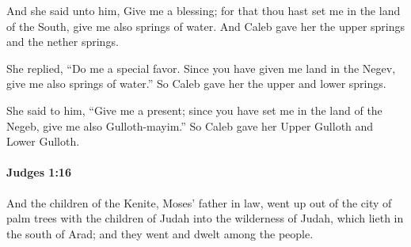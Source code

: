 			\begin{versebox}
					\item[BHS] 
					\item[ASV] And she said unto him, Give me a blessing; for that thou hast set me in the land of the South, give me also springs of water. And Caleb gave her the upper springs and the nether springs.
					\item[NIV] She replied, “Do me a special favor. Since you have given me land in the Negev, give me also springs of water.” So Caleb gave her the upper and lower springs.
					\item[NRSV] She said to him, “Give me a present; since you have set me in the land of the Negeb, give me also Gulloth-mayim.” So Caleb gave her Upper Gulloth and Lower Gulloth.
			\end{versebox}

		\paragraph{Judges 1:16} %
			\label{JUDGES-1-16}

			And the children of the Kenite, Moses’ father in law, went up out of the city of palm trees with the children of Judah into the wilderness of Judah, which lieth in the south of Arad; and they went and dwelt among the people.

